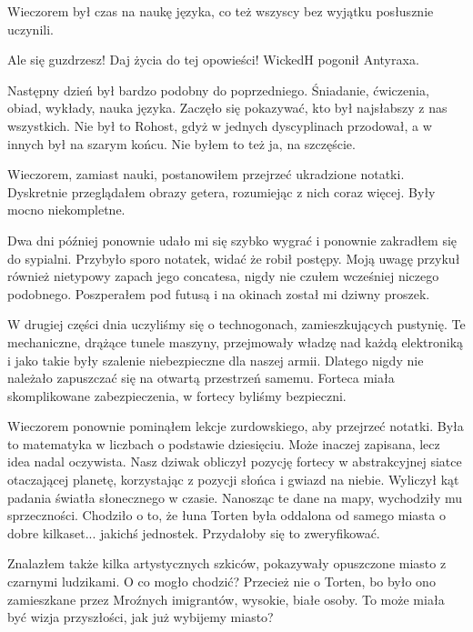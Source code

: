 Wieczorem był czas na naukę języka, co też wszyscy bez wyjątku posłusznie uczynili.

\divider{}

\begin{dialogue}
\ds{} Ale się guzdrzesz! Daj życia do tej opowieści! \dm{} WickedH pogonił Antyraxa.
\end{dialogue}

\divider{}

Następny dzień był bardzo podobny do poprzedniego.
Śniadanie, ćwiczenia, obiad, wykłady, nauka języka.
Zaczęło się pokazywać, kto był najsłabszy z nas wszystkich.
Nie był to Rohost, gdyż w jednych dyscyplinach przodował, a w innych był na szarym końcu.
Nie byłem to też ja, na szczęście.

Wieczorem, zamiast nauki, postanowiłem przejrzeć ukradzione notatki.
Dyskretnie przeglądałem obrazy getera, rozumiejąc z nich coraz więcej.
Były mocno niekompletne.

Dwa dni później ponownie udało mi się szybko wygrać i ponownie zakradłem się do sypialni.
Przybyło sporo notatek, widać że robił postępy.
Moją uwagę przykuł również nietypowy zapach jego concatesa, nigdy nie czułem wcześniej niczego podobnego.
Poszperałem pod futusą i na okinach został mi dziwny proszek.

W drugiej części dnia uczyliśmy się o technogonach, zamieszkujących pustynię.
Te mechaniczne, drążące tunele maszyny, przejmowały władzę nad każdą elektroniką i jako takie były szalenie niebezpieczne dla naszej armii.
Dlatego nigdy nie należało zapuszczać się na otwartą przestrzeń samemu.
Forteca miała skomplikowane zabezpieczenia, w fortecy byliśmy bezpieczni.

Wieczorem ponownie pominąłem lekcje zurdowskiego, aby przejrzeć notatki.
Była to matematyka w liczbach o podstawie dziesięciu. Może inaczej zapisana, lecz idea nadal oczywista.
Nasz dziwak obliczył pozycję fortecy w abstrakcyjnej siatce otaczającej planetę, korzystając z pozycji słońca i gwiazd na niebie.
Wyliczył kąt padania światła słonecznego w czasie.
Nanosząc te dane na mapy, wychodziły mu sprzeczności.
Chodziło o to, że łuna Torten była oddalona od samego miasta o dobre kilkaset... jakichś jednostek.
Przydałoby się to zweryfikować.

Znalazłem także kilka artystycznych szkiców, pokazywały opuszczone miasto z czarnymi ludzikami.
O co mogło chodzić? Przecież nie o Torten, bo było ono zamieszkane przez Mroźnych imigrantów, wysokie, białe osoby.
To może miała być wizja przyszłości, jak już wybijemy miasto?

